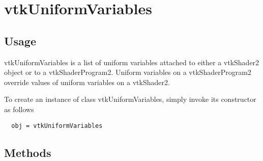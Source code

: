 \section{vtkUniformVariables}

\subsection{Usage}

 vtkUniformVariables is a list of uniform variables attached to either a
 vtkShader2 object or to a vtkShaderProgram2. Uniform variables on
 a vtkShaderProgram2 override values of uniform variables on a vtkShader2.

To create an instance of class vtkUniformVariables, simply
invoke its constructor as follows
\begin{verbatim}
  obj = vtkUniformVariables
\end{verbatim}
\subsection{Methods}

